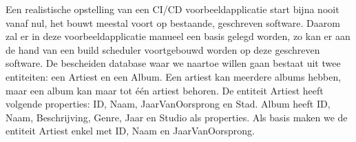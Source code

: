 %            
%        
%        
%        
            
            Een realistische opstelling van een CI/CD voorbeeldapplicatie start bijna nooit vanaf nul, het bouwt meestal voort op bestaande, geschreven software.
            Daarom zal er in deze voorbeeldapplicatie manueel een basis gelegd worden, zo kan er aan de hand van een build scheduler voortgebouwd worden op deze geschreven software.
            De bescheiden database waar we naartoe willen gaan bestaat uit twee entiteiten: een Artiest en een Album. Een artiest kan meerdere albums hebben, maar een album kan maar tot één artiest behoren. De entiteit Artiest heeft volgende properties: ID, Naam, JaarVanOorsprong en Stad. Album heeft ID, Naam, Beschrijving, Genre, Jaar en Studio als properties. Als basis maken we de entiteit Artiest enkel met ID, Naam en JaarVanOorsprong.
            

